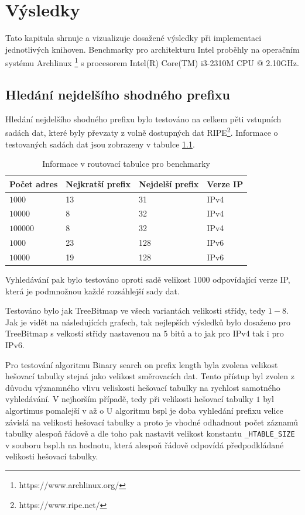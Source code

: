 \chapter{Výsledky}\label{chapter:results}
Tato kapitula shrnuje a vizualizuje dosažené výsledky při implementaci jednotlivých knihoven.
Benchmarky pro architekturu Intel proběhly na operačním systému Archlinux \footnote{https://www.archlinux.org/} s procesorem Intel(R) Core(TM) i3-2310M CPU @ 2.10GHz.

\section{Hledání nejdelšího shodného prefixu}

Hledání nejdelšího shodného prefixu bylo testováno na celkem pěti vstupních sadách dat, které
byly převzaty z volně dostupných dat RIPE\footnote{https://www.ripe.net/}.
Informace o testovaných sadách dat jsou zobrazeny v tabulce \ref{tab:lpm-input}.

\begin{table}[!htb]
	\center
	\label{tab:lpm-input}
	\caption{Informace v routovací tabulce pro benchmarky}
    \begin{tabular}{|l|l|l|l|}
    \hline
    Počet adres & Nejkratší prefix & Nejdelší prefix & Verze IP \\ \hline
    $1000$ & 13 & 31 & IPv4 \\ \hline
    $10000$ & 8 & 32 & IPv4 \\ \hline
    $100000$ & 8 & 32 & IPv4 \\ \hline
    $1000$ & 23 & 128 & IPv6 \\ \hline
    $10000$ & 19 & 128 & IPv6 \\ \hline
    \end{tabular}
\end{table}

Vyhledávání pak bylo testováno oproti sadě velikost $1000$ odpovídající verze IP, která je podmnožnou každé
rozsáhlejší sady dat.

Testováno bylo jak TreeBitmap ve všech variantách velikosti střídy, tedy $1-8$.
Jak je vidět na následujících grafech, tak nejlepších výsledků bylo dosaženo pro TreeBitmap s velkostí
střidy nastavenou na $5$ bitů a to jak pro IPv4 tak i pro IPv6.

Pro testování algoritmu Binary search on prefix length byla zvolena velikost hešovací tabulky
stejná jako velikost směrovacích dat. Tento přístup byl zvolen z důvodu významného vlivu
veliskosti hešovací tabulky na rychlost samotného vyhledávání. V nejhorším případě, tedy při
velikosti hešovací tabulky $1$ byl algortimus pomalejší v až o
U algoritmu bspl je doba vyhledání prefixu velice závislá na velikosti hešovací tabulky a proto je vhodné odhadnout počet záznamů tabulky alespoň řádově a dle toho pak nastavit velikost konstantu {\tt \_HTABLE\_SIZE} v souboru bspl.h na hodnotu, která alespoň řádově odpovídá předpodkládané velikosti hešovací tabulky.

